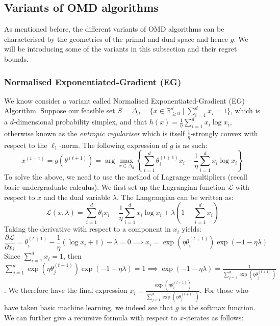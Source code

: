 \subsection{Variants of OMD algorithms}
As mentioned before, the different variants of OMD algorithms can be characterised by the geometries of the primal and dual space and hence $g$. We will be introducing some of the variants in this subsection and their regret bounds.


\subsubsection{Normalised Exponentiated-Gradient (EG)}
\label{subsubsec:normalised_eg}
We know consider a variant called Normalised Exponentiated-Gradient (EG) \citep{kivinen1997exponentiated} Algorithm. Suppose our feasible set $S = \Delta_d = \{x \in \mathbb R^d_{\geq 0} \mid \sum_{i=1}^d x_i = 1\}$, which is a $d$-dimensional probability simplex, and that $h(x) = \frac{1}{\eta}\sum_{i=1}^d x_i \log x_i$, otherwise known as the \textit{entropic regulariser} which is itself $\frac{1}{\eta}$-strongly convex with respect to the $\ell_1$-norm. The following expression of $g$ is as such:
\begin{equation*}
    x^{(t+1)} = g(\theta^{(t+1)}) = \arg\max_{x \in \Delta_d} \left\{\sum_{i=1}^d \theta_i^{(t+1)}x_i - \frac{1}{\eta}\sum_{i=1}^d x_i \log x_i\right\}
\end{equation*}
To solve the above, we need to use the method of Lagrange multipliers (recall basic undergraduate calculus). We first set up the Lagrangian function $\mathcal L$ with respect to $x$ and the dual variable $\lambda$. The Langrangian can be written as:
\begin{equation}
    \mathcal L(x, \lambda) = \sum_{i=1}^d \theta_ix_i - \frac{1}{\eta}\sum_{i=1}^d x_i \log x_i + \lambda\left(1 - \sum_{i=1}^dx_i \right)
\end{equation}
Taking the derivative with respect to a component in $x_i$ yields:\begin{equation*}
    \frac{\partial \mathcal L}{\partial x_i} = \theta_i^{(t+1)}- \frac{1}{\eta}(\log x_i + 1) - \lambda = 0 \implies x_i = \exp(\eta \theta_i^{(t+1)})\exp(-1 - \eta \lambda)
    \end{equation*}
Since $\sum_{i=1}^d x_i = 1$, then $\sum_{j=1}^d \exp(\eta \theta_j^{(t+1)})\exp(-1 - \eta \lambda) = 1 \implies \exp(-1-\eta\lambda) = \frac{1}{\sum_{j=1}^d \exp(\eta \theta_j^{(t+1)})}$.
We therefore have the final expression $x_i = \frac{\exp(\eta \theta_i^{(t+1)})}{\sum_{j=1}^d \exp(\eta \theta_j^{(t+1)})}$. For those who have taken basic machine learning, we indeed see that $g$ is the softmax function. We can further give a recursive formula with respect to $x$-iterates as follows:

